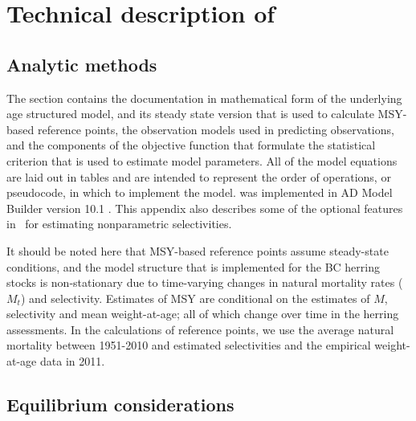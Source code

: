 \section{Technical description of \iscam}\label{appiSCAM}
	\subsection{Analytic methods}
	The section contains the documentation in mathematical form of the underlying age structured model, and its steady state version that is used to calculate MSY-based reference points, the observation models used in predicting observations, and the components of the objective function that formulate the statistical criterion that is used to estimate model parameters. All of the model equations are laid out in tables and are intended to represent the order of operations, or pseudocode, in which to implement the model. \iscam was implemented in AD Model Builder version 10.1 \citep{ADMB2009}.  This appendix also describes some of the optional features in \iscam\ for estimating nonparametric selectivities.  
	
	It should be noted here that MSY-based reference points assume steady-state conditions, and the model structure that is implemented for the BC herring stocks is non-stationary due to time-varying changes in natural mortality rates ($M_t$) and selectivity.  Estimates of MSY are conditional on the estimates of $M$, selectivity and mean weight-at-age; all of which change over time in the herring assessments.  In the calculations of reference points, we use the average natural mortality between 1951-2010 and estimated selectivities and the empirical weight-at-age data in 2011.

\subsection{Equilibrium considerations}

